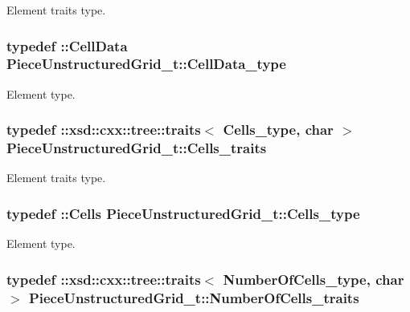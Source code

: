 Element traits type. 

\hypertarget{classPieceUnstructuredGrid__t_a4232a7b88477ee6f692a4e5fab6a65d1}{
\subsubsection[{Cell\+Data\+\_\+type}]{\setlength{\rightskip}{0pt plus 5cm}typedef \+::{\bf Cell\+Data} {\bf Piece\+Unstructured\+Grid\+\_\+t\+::\+Cell\+Data\+\_\+type}}}\label{classPieceUnstructuredGrid__t_a4232a7b88477ee6f692a4e5fab6a65d1}


Element type. 

\hypertarget{classPieceUnstructuredGrid__t_a33252b6f55b5ae830ceecdf9be42cce1}{
\subsubsection[{Cells\+\_\+traits}]{\setlength{\rightskip}{0pt plus 5cm}typedef \+::xsd\+::cxx\+::tree\+::traits$<$ {\bf Cells\+\_\+type}, char $>$ {\bf Piece\+Unstructured\+Grid\+\_\+t\+::\+Cells\+\_\+traits}}}\label{classPieceUnstructuredGrid__t_a33252b6f55b5ae830ceecdf9be42cce1}


Element traits type. 

\hypertarget{classPieceUnstructuredGrid__t_aca1ec38eff08bde0cd115c54dbb7a20f}{
\subsubsection[{Cells\+\_\+type}]{\setlength{\rightskip}{0pt plus 5cm}typedef \+::{\bf Cells} {\bf Piece\+Unstructured\+Grid\+\_\+t\+::\+Cells\+\_\+type}}}\label{classPieceUnstructuredGrid__t_aca1ec38eff08bde0cd115c54dbb7a20f}


Element type. 

\hypertarget{classPieceUnstructuredGrid__t_a7c7607d306bde9e187b9cb3f570d6155}{
\subsubsection[{Number\+Of\+Cells\+\_\+traits}]{\setlength{\rightskip}{0pt plus 5cm}typedef \+::xsd\+::cxx\+::tree\+::traits$<$ {\bf Number\+Of\+Cells\+\_\+type}, char $>$ {\bf Piece\+Unstructured\+Grid\+\_\+t\+::\+Number\+Of\+Cells\+\_\+traits}}}\label{classPieceUnstructuredGrid__t_a7c7607d306bde9e187b9cb3f570d6155}


